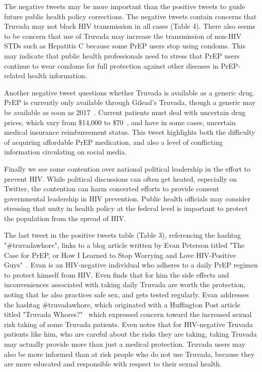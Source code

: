 \documentclass{sig-alternate-05-2015}
\begin{document}
The negative tweets may be more important than the positive tweets to guide future public health policy corrections. The negative tweets contain concerns that Truvada may not block HIV transmission in all cases (Table 4). There also seems to be concern that use of Truvada may increase the transmission of non-HIV STDs such as Hepatitis C because some PrEP users stop using condoms. This may indicate that public health professionals need to stress that PrEP users continue to wear condoms for full protection against other diseases in PrEP-related health information.

Another negative tweet questions whether Truvada is available as a generic drug. PrEP is currently only available through Gilead's Truvada, though a generic may be available as soon as 2017~\cite{truvadagenericblog}. Current patients must deal with uncertain drug prices, which vary from \$14,000 to \$70~\cite{truvadagenericblog}, and have in some cases, uncertain medical insurance reimbursement status. This tweet highlights both the difficulty of acquiring affordable PrEP medication, and also a level of conflicting information circulating on social media.

Finally we see some contention over national political leadership in the effort to prevent HIV. While political discussions can often get heated, especially on Twitter, the contention can harm concerted efforts to provide consent governmental leadership in HIV prevention. Public health officials may consider stressing that unity in health policy at the federal level is important to protect the population from the spread of HIV.

The last tweet in the positive tweets table (Table 3), referencing the hashtag "\#truvadawhore", links to a blog article written by Evan Peterson titled "The Case for PrEP, or How I Learned to Stop Worrying and Love HIV-Positive Guys"~\cite{caseforprep}. Evan is an HIV-negative individual who adheres to a daily PrEP regimen to protect himself from HIV. Even finds that for him the side effects and inconveniences associated with taking daily Truvada are worth the protection, noting that he also practices safe sex, and gets tested regularly. Evan addresses the hashtag \#truvadawhore, which originated with a Huffington Post article titled "Truvada Whores?"~\cite{truvadawhore} which expressed concern toward the increased sexual risk taking of some Truvada patients. Even notes that for HIV-negative Truvada patients like him, who are careful about the risks they are taking, taking Truvada may actually provide more than just a medical protection. Truvada users may also be more informed than at risk people who do not use Truvada, because they are more educated and responsible with respect to their sexual health.
\end{document}
